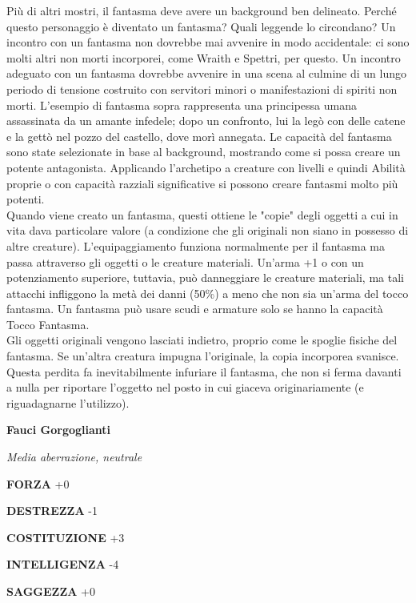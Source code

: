 \begin{multicols}{2}
	Più di altri mostri, il fantasma deve avere un background ben delineato. Perché questo personaggio è diventato un fantasma? Quali leggende lo circondano? Un incontro con un fantasma non dovrebbe mai avvenire in modo accidentale: ci sono molti altri non morti incorporei, come Wraith e Spettri, per questo. Un incontro adeguato con un fantasma dovrebbe avvenire in una scena al culmine di un lungo periodo di tensione costruito con servitori minori o manifestazioni di spiriti non morti. L'esempio di fantasma sopra rappresenta una principessa umana assassinata da un amante infedele; dopo un confronto, lui la legò con delle catene e la gettò nel pozzo del castello, dove morì annegata. Le capacità del fantasma sono state selezionate in base al background, mostrando come si possa creare un potente antagonista. Applicando l'archetipo a creature con livelli e quindi Abilità proprie o con capacità razziali significative si possono creare fantasmi molto più potenti.\\

	Quando viene creato un fantasma, questi ottiene le "copie" degli oggetti a cui in vita dava particolare valore (a condizione che gli originali non siano in possesso di altre creature). L'equipaggiamento funziona normalmente per il fantasma ma passa attraverso gli oggetti o le creature materiali. Un'arma +1 o con un potenziamento superiore, tuttavia, può danneggiare le creature materiali, ma tali attacchi infliggono la metà dei danni (50\%) a meno che non sia un'arma del tocco fantasma. Un fantasma può usare scudi e armature solo se hanno la capacità Tocco Fantasma.\\

	Gli oggetti originali vengono lasciati indietro, proprio come le spoglie fisiche del fantasma. Se un'altra creatura impugna l'originale, la copia incorporea svanisce. Questa perdita fa inevitabilmente infuriare il fantasma, che non si ferma davanti a nulla per riportare l'oggetto nel posto in cui giaceva originariamente (e riguadagnarne l'utilizzo).


	\medskip{}\textbf{Fauci Gorgoglianti}

	\textit{Media aberrazione, neutrale}

	\textbf{FORZA} +0

	\textbf{DESTREZZA} -1

	\textbf{COSTITUZIONE} +3

	\textbf{INTELLIGENZA} -4

	\textbf{SAGGEZZA} +0


\end{multicols}
